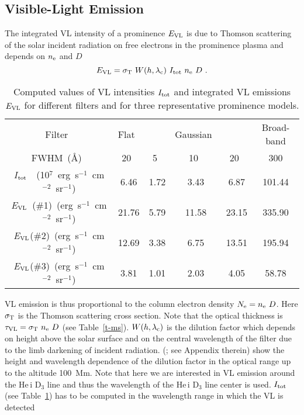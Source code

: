 \documentclass[namedreferences]{solarphysics}
\begin{document}
\begin{article}
\section{Visible-Light Emission}
	\label{s-evl}

The integrated VL intensity of a prominence $E_{\rm VL}$ is due to Thomson scattering of the solar incident radiation on free electrons 
in the prominence plasma and depends on $n_{\rm e}$ and $D$
\begin{equation}
E_{\rm VL} = \sigma_{\rm T}~W(h, \lambda_{\rm c})~I_{\rm tot}~n_{\rm e}~D  \ .
\label{e-evl}
\end{equation}
\begin{table}  %
\caption{Computed values of VL intensities $I_{\rm tot}$ and integrated VL emissions $E_{\rm VL}$ for different 
filters and for three representative prominence models.}
\label{t-evl}
\begin{tabular}{cccccc} 
 \hline Filter~&Flat~&~&Gaussian~&~&Broad-band \\
	FWHM~(\AA)~&20~&5~&10~&20~&300 \\
 \hline {\it I$_{\rm tot}$~}~(10$^{7}$~erg~s$^{-1}$~cm$^{-2}$~sr$^{-1}$)&6.46&1.72&3.43&6.87&101.44 \\
       {\it E$_{\rm VL}$~}(\#1)~(erg~s$^{-1}$~cm$^{-2}$~sr$^{-1}$)&21.76&5.79&11.58&23.15&335.90 \\
         {\it E$_{\rm VL}$}(\#2)~(erg~s$^{-1}$~cm$^{-2}$~sr$^{-1}$)&12.69&3.38&6.75&13.51&195.94 \\
	 {\it E$_{\rm VL}$}(\#3)~(erg~s$^{-1}$~cm$^{-2}$~sr$^{-1}$)&3.81&1.01&2.03&4.05&58.78 \\
 \hline
\end{tabular}
\end{table} 
VL emission is thus proportional to the column electron density $N_{\rm e} = n_{\rm e}~D$. Here $\sigma_{\rm T}$ is the Thomson scattering cross section.
Note that the optical thickness is $\tau_{\rm VL} = \sigma_{\rm T}~n_{\rm e}~D$ (see Table~\ref{t-ms}). 
$W(h, \lambda_{\rm c})$ is the dilution factor which depends on height above the solar surface and on the central wavelength of the filter due to the limb darkening of incident radiation. 
\citeauthor{Jej09} (\citeyear{Jej09}; see Appendix therein) show the height and wavelength dependence of the dilution factor in the optical range up to the altitude 100~Mm.
Note that here we are interested in VL emission around the He\,{\sc i} D$_{3}$ line and thus the wavelength of the He\,{\sc i} D$_{3}$ line center is used.
$I_{\rm tot}$ (see Table~\ref{t-evl}) has to be computed in the wavelength range in which the VL is detected

\end{article}
\end{document}
